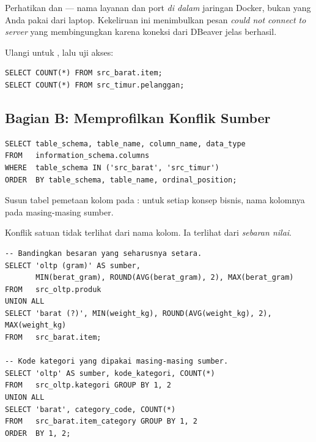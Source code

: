 \begin{catatan}
Perhatikan  dan  ---
nama layanan dan port \emph{di dalam} jaringan Docker, bukan
 yang Anda pakai dari laptop. Kekeliruan ini
menimbulkan pesan \emph{could not connect to server} yang membingungkan karena
koneksi dari DBeaver jelas berhasil.
\end{catatan}

Ulangi untuk , lalu uji akses:

\begin{lstlisting}[style=sqlgaya]
SELECT COUNT(*) FROM src_barat.item;
SELECT COUNT(*) FROM src_timur.pelanggan;
\end{lstlisting}

\subsection{Bagian B: Memprofilkan Konflik Sumber}


\begin{lstlisting}[style=sqlgaya]
SELECT table_schema, table_name, column_name, data_type
FROM   information_schema.columns
WHERE  table_schema IN ('src_barat', 'src_timur')
ORDER  BY table_schema, table_name, ordinal_position;
\end{lstlisting}

Susun tabel pemetaan kolom pada : untuk setiap
konsep bisnis, nama kolomnya pada masing-masing sumber.


Konflik satuan tidak terlihat dari nama kolom. Ia terlihat dari
\emph{sebaran nilai}.

\begin{lstlisting}[style=sqlgaya]
-- Bandingkan besaran yang seharusnya setara.
SELECT 'oltp (gram)' AS sumber,
       MIN(berat_gram), ROUND(AVG(berat_gram), 2), MAX(berat_gram)
FROM   src_oltp.produk
UNION ALL
SELECT 'barat (?)', MIN(weight_kg), ROUND(AVG(weight_kg), 2), MAX(weight_kg)
FROM   src_barat.item;

-- Kode kategori yang dipakai masing-masing sumber.
SELECT 'oltp' AS sumber, kode_kategori, COUNT(*)
FROM   src_oltp.kategori GROUP BY 1, 2
UNION ALL
SELECT 'barat', category_code, COUNT(*)
FROM   src_barat.item_category GROUP BY 1, 2
ORDER  BY 1, 2;
\end{lstlisting}


